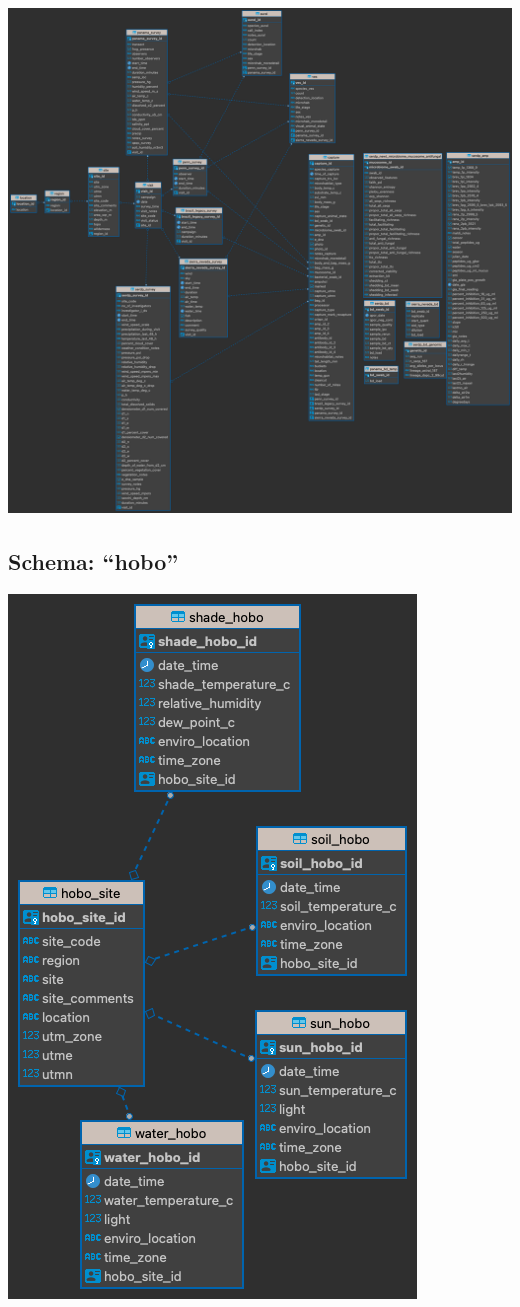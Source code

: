 \documentclass[
]{article}
\begin{document}
\includegraphics{RIBBiTR - survey_data.png}

\hypertarget{schema-hobo}{%
\subsection{Schema: ``hobo''}\label{schema-hobo}}

\includegraphics{RIBBiTR - hobo.png}
\end{document}
